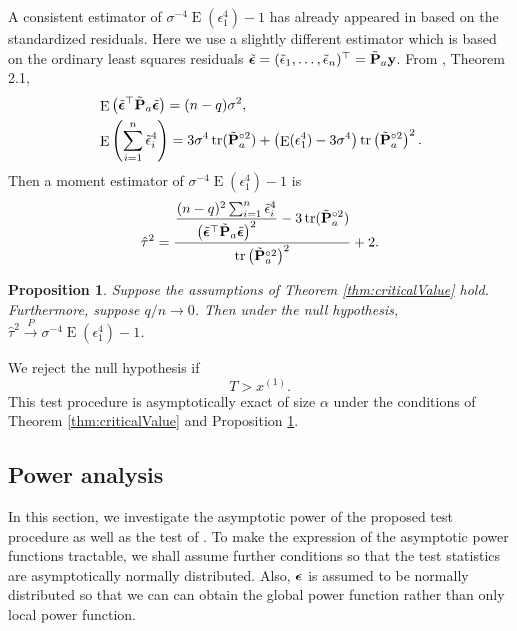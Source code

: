 \documentclass[11pt]{article}
\DeclareMathOperator{\mytr}{tr}
\DeclareMathOperator{\myE}{E}
\newcommand{\By}{\mathbf{y}}    \newcommand{\Bz}{\mathbf{z}}
\theoremstyle{plain}
\newtheorem{proposition}{\quad\quad Proposition}
\theoremstyle{definition}
\theoremstyle{remark}
\begin{document}
        A consistent estimator of $\sigma^{-4} \myE (\epsilon_1^4)-1$ has already appeared in \cite{Bai2017} based on the standardized residuals.
        Here we use a slightly different estimator which is based on the ordinary least squares residuals $\tilde \bepsilon=(\tilde \epsilon_1,\ldots, \tilde \epsilon_n)^\top= \tilde \BP_a \By$.
    From \cite{Bai2017}, Theorem 2.1, 
    \begin{align*}
        &\myE \left( \tilde \bepsilon^\top  \tilde \BP_a \tilde \bepsilon \right)
        = (n-q) \sigma^2,
        \\
        &\myE \left( \sum_{i=1}^n \tilde \epsilon_i^4 \right)
        =
        3\sigma^4 \mytr (\tilde \BP_a^{\circ 2}) 
        +\left( \myE (\epsilon_1^4)-3 \sigma^{4}\right)
        \mytr \left( \tilde \BP_a^{\circ 2}  \right)^2.
    \end{align*}
    Then a moment estimator of $\sigma^{-4}\myE (\epsilon_1^4)-1$ is 
\begin{equation*}
    \hat \tau^2 =
    \frac{
        \displaystyle\frac{(n-q)^2 \sum_{i=1}^n \tilde{\epsilon}_i^4}{\left( \tilde \bepsilon^\top \tilde \BP_a  \tilde \bepsilon \right)^2}
        - 3\mytr (\tilde \BP_a^{\circ 2})
    }{
        \mytr\left(  \tilde \BP_a^{\circ 2} \right)^2
    }
    +2.
\end{equation*}

\begin{proposition}\label{prop:estimation}
    Suppose the assumptions of Theorem \ref{thm:criticalValue} hold.
    Furthermore, suppose $q/n\to 0$.
    Then under the null hypothesis, $\hat \tau^2 \xrightarrow{P} \sigma^{-4} \myE (\epsilon_1^4)-1$.
\end{proposition}
We reject the null hypothesis if 
\begin{equation*}
    T > x^{(1)}.
\end{equation*}
This test procedure is asymptotically exact of size $\alpha$ under the conditions of Theorem \ref{thm:criticalValue} and Proposition \ref{prop:estimation}.


\subsection{Power analysis}
In this section, we investigate the asymptotic power of the proposed test procedure as well as the test of \cite{Goeman2006}.
To make the expression of the asymptotic power functions tractable, we shall assume further conditions so that the test statistics are asymptotically normally distributed.
Also, $\boldsymbol{\epsilon}$ is assumed to be normally distributed so that we can can obtain the global power function rather than only local power function.
\end{document}
